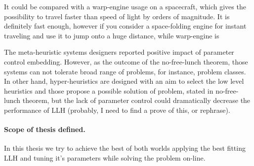 
It could be compared with a warp-engine usage on a spacecraft, which gives the possibility to travel faster than speed of light by orders of magnitude. It is definitely fast enough, however if you consider a space-folding engine for instant traveling and use it to jump onto a huge distance, while warp-engine is 


The meta-heuristic systems designers reported positive impact of parameter control embedding. 
However, as the outcome of the no-free-lunch theorem, those systems can not tolerate broad range of problems, for instance, problem classes.
In other hand, hyper-heuristics are designed with an aim to select the low level heuristics and those propose a possible solution of problem, stated in no-free-lunch theorem, but the lack of parameter control could dramatically decrease the performance of LLH (probably, I need to find a prove of this, or rephrase).

\paragraph{Scope of thesis defined.} In this thesis we try to achieve the best of both worlds applying the best fitting LLH and tuning it's parameters while solving the problem on-line.